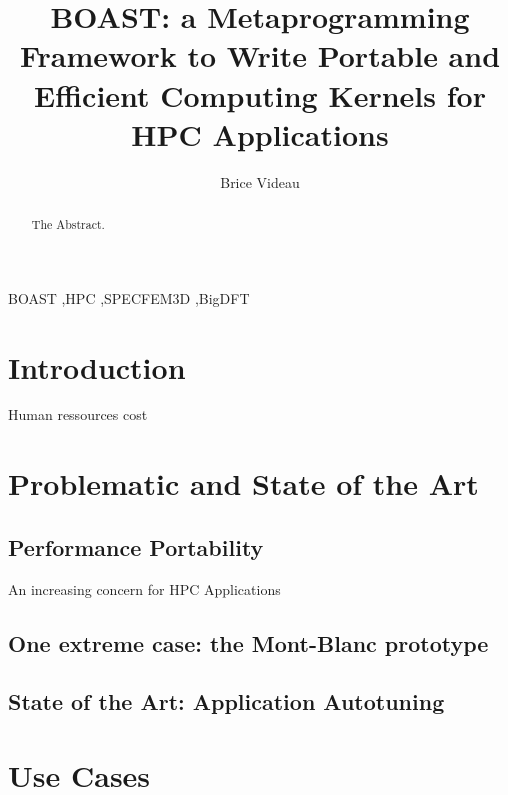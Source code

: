 \documentclass[review]{elsarticle}
\begin{document}
\begin{frontmatter}

\title{BOAST: a Metaprogramming Framework to Write Portable and Efficient Computing Kernels for HPC Applications}

\author[mymainaddress]{Brice Videau}

\address[mymainaddress]{LIG/CNRS}

\begin{abstract}
The Abstract.
\end{abstract}

\begin{keyword}
BOAST \sep HPC \sep SPECFEM3D \sep BigDFT
\end{keyword}

\end{frontmatter}

\linenumbers

\section{Introduction}

Human ressources cost

\cite{videau2013boast}

\section{Problematic and State of the Art}


  \subsection{Performance Portability}

    An increasing concern for HPC Applications


  \subsection{One extreme case: the Mont-Blanc prototype}


  \subsection{State of the Art: Application Autotuning}


\section{Use Cases}
\end{document}

